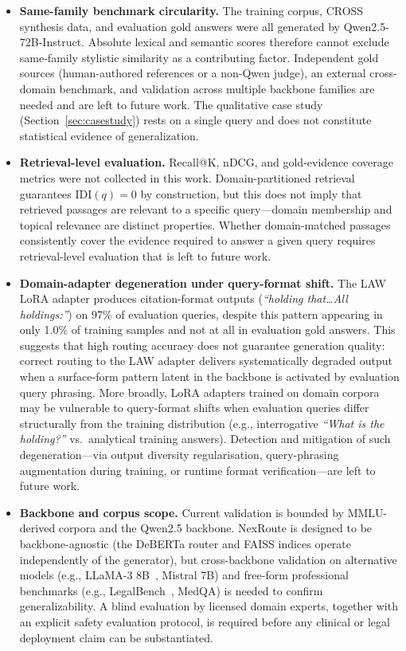\documentclass[a4paper,fleql]{cas-sc}
\begin{document}
\begin{itemize}
\item \textbf{Same-family benchmark circularity.}
The training corpus, CROSS synthesis data, and evaluation gold answers were
all generated by Qwen2.5-72B-Instruct. Absolute lexical and semantic scores
therefore cannot exclude same-family stylistic similarity as a contributing
factor. Independent gold sources (human-authored references or a non-Qwen
judge), an external cross-domain benchmark, and validation across multiple
backbone families are needed and are left to future work. The qualitative
case study (Section~\ref{sec:casestudy})
rests on a single query and does not constitute statistical evidence of
generalization.

\item \textbf{Retrieval-level evaluation.}
Recall@K, nDCG, and gold-evidence coverage metrics were not collected in this
work. Domain-partitioned retrieval guarantees $\mathrm{IDI}(q){=}0$ by
construction, but this does not imply that retrieved passages are relevant to
a specific query---domain membership and topical relevance are distinct
properties. Whether domain-matched passages consistently cover the evidence
required to answer a given query requires retrieval-level evaluation that is
left to future work.

\item \textbf{Domain-adapter degeneration under query-format shift.}
The LAW LoRA adapter produces citation-format outputs (\textit{``holding
that\ldots All holdings:''}) on 97\% of evaluation queries, despite this
pattern appearing in only 1.0\% of training samples and not at all in
evaluation gold answers.
This suggests that high routing accuracy does not guarantee generation quality:
correct routing to the LAW adapter delivers systematically degraded output when
a surface-form pattern latent in the backbone is activated by evaluation query
phrasing.
More broadly, LoRA adapters trained on domain corpora may be vulnerable to
query-format shifts when evaluation queries differ structurally from the
training distribution (e.g., interrogative \textit{``What is the holding?''}
vs.\ analytical training answers).
Detection and mitigation of such degeneration---via output diversity
regularisation, query-phrasing augmentation during training, or runtime
format verification---are left to future work.

\item \textbf{Backbone and corpus scope.} Current validation is bounded by MMLU-derived corpora and the Qwen2.5
backbone. NexRoute is designed to be backbone-agnostic (the DeBERTa router
and FAISS indices operate independently of the generator), but cross-backbone
validation on alternative models (e.g., LLaMA-3 8B~\citep{grattafiori2024llama3},
Mistral 7B) and free-form professional benchmarks (e.g.,
LegalBench~\citep{guha2023legalbench}, MedQA) is needed to confirm
generalizability. A blind evaluation by licensed domain experts, together
with an explicit safety evaluation protocol, is required before any clinical
or legal deployment claim can be substantiated.
\end{itemize}
\end{document}
